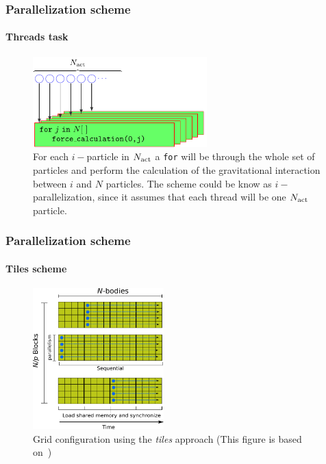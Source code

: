 \begin{frame}
    \frametitle{Parallelization scheme}
    \framesubtitle{Threads task}

    \begin{center}
    \begin{figure}[H]
        \centering
        \includegraphics[width=0.6\textwidth]{img/force_nact.pdf}
        \caption{For each $i-$particle in $N_{\rm act}$ a \texttt{for} will be through
                 the whole set of particles and perform the calculation of the
                 gravitational interaction between $i$ and $N$ particles.
                 The scheme could be know as $i-$parallelization, since it assumes
                 that each thread will be one $N_{\rm act}$
                 particle.}
        \label{fig:force_nact}
    \end{figure}
    \end{center}

\end{frame}

\begin{frame}
    \frametitle{Parallelization scheme}
    \framesubtitle{Tiles scheme}

    \begin{center}
    \begin{figure}[H]
        \centering
        \includegraphics[width=0.45\textwidth]{img/tiles.pdf}
        \caption{Grid configuration using the \emph{tiles} approach (This figure
        is based on~\cite{gpuGems3})}
        \label{fig:tile}
    \end{figure}
    \end{center}

\end{frame}

